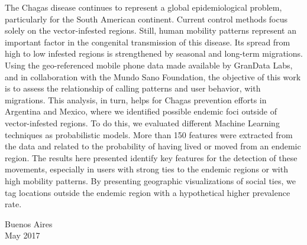 The Chagas disease continues to represent a global epidemiological problem, particularly for the South American continent. Current control methods focus solely on the vector-infested regions. Still, human mobility patterns represent an important factor in the congenital transmission of this disease. Its spread from high to low infested regions is strengthened by seasonal and long-term migrations. Using the geo-referenced mobile phone data made available by GranData Labs, and in collaboration with the Mundo Sano Foundation, the objective of this work is to assess the relationship of calling patterns and user behavior, with migrations. This analysis, in turn, helps for Chagas prevention efforts in Argentina and Mexico, where we identified possible endemic foci outside of vector-infested regions. To do this, we evaluated different Machine Learning techniques as probabilistic models. More than 150 features were extracted from the data and related to the probability of having lived or moved from an endemic region. The results here presented identify key features for the detection of these movements, especially in users with strong ties to the endemic regions or with high mobility patterns. By presenting geographic visualizations of social ties, we tag locations outside the endemic region with a hypothetical higher prevalence rate.

\begin{flushright}
	\bigskip
	Buenos Aires\\
	May 2017
\end{flushright}